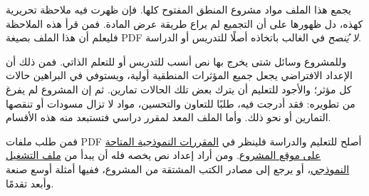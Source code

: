 \documentclass[../include/open-logic-part]{subfiles}
\begin{document}
\clearpage

\begin{editorial}
يجمع هذا الملف مواد مشروع المنطق المفتوح كلها. فإن ظهرت فيه ملاحظة
تحريرية كهذه، دل ظهورها على أن التجميع لم يراع طريقة عرض المادة.
فمن قرأ هذه الملاحظة فليعلم أن هذا الملف بصيغة PDF \emph{لا يُنصح}
في الغالب باتخاذه أصلًا للتدريس أو الدراسة.

وللمشروع وسائل شتى يخرج بها نص أنسب للتدريس أو للتعلم الذاتي. فمن ذلك
أن الإعداد الافتراضي يجعل جميع المؤثرات المنطقية أولية، ويستوفي في
البراهين حالات كل مؤثر؛ والأجود للتعليم أن يترك بعض تلك الحالات تمارين.
ثم إن المشروع لم يفرغ من تطويره: فقد أدرجت فيه، طلبًا للتعاون والتحسين،
مواد لا تزال مسودات أو تنقصها التمارين أو نحو ذلك. وأما الملف المعد
لمقرر دراسي فتستبعد منه هذه الأقسام.

فمن طلب ملفات PDF أصلح للتعليم والدراسة فلينظر في
\href{http://builds.openlogicproject.org/}{المقررات النموذجية المتاحة على موقع المشروع}.
ومن أراد إعداد نص يخصه فله أن يبدأ من
\href{https://github.com/OpenLogicProject/OpenLogic/tree/master/courses/sample}{ملف التشغيل النموذجي}،
أو يرجع إلى مصادر الكتب المشتقة من المشروع، ففيها أمثلة أوسع صنعة وأبعد تقدمًا.
\end{editorial}

\end{document}
